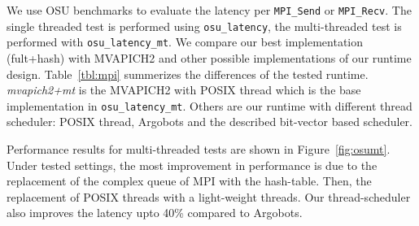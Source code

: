We use OSU benchmarks \cite{osubench} to evaluate the latency per
\texttt{MPI_Send} or \texttt{MPI_Recv}. The single threaded test is performed
using \texttt{osu_latency}, the multi-threaded test is performed with
\texttt{osu_latency_mt}. We compare our best implementation (fult+hash) with
MVAPICH2 and other possible implementations of our runtime design.
Table~\ref{tbl:mpi} summerizes the differences of the tested runtime.
\textit{mvapich2+mt} is the MVAPICH2 with POSIX thread which is the base
implementation in \texttt{osu_latency_mt}. Others are our runtime
with different thread scheduler: POSIX thread, Argobots and the described
bit-vector based scheduler.

Performance results for multi-threaded tests are shown in
Figure~\ref{fig:osumt}.  Under tested settings, the most improvement in
performance is due to the replacement of the complex queue of MPI with the
hash-table.  Then, the replacement of POSIX threads with a light-weight
threads. Our thread-scheduler also improves the latency upto 40\% compared
to Argobots.
